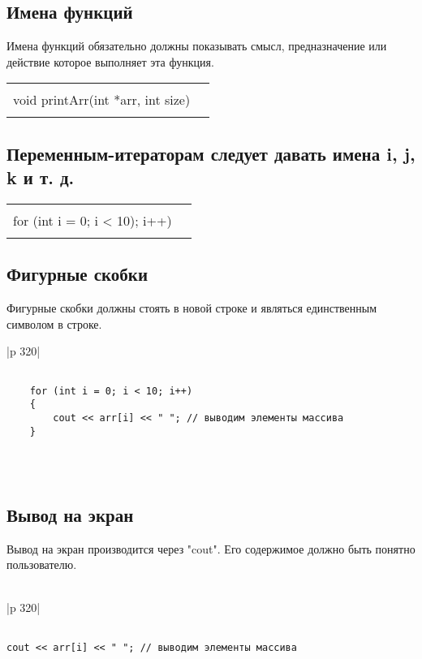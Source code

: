\documentclass{article}
\begin{document}
\subsection{Имена функций}
Имена функций обязательно должны показывать смысл, предназначение или действие которое выполняет эта функция.\\
\begin{tabular}{|c|c}
\hline
    \\
    void printArr(int *arr, int size)\\
    \\
\hline      
\end{tabular}

\subsection{Переменным-итераторам следует давать имена i, j, k и т. д.}

\begin{tabular}{|c|c}
\hline
    \\
    for (int i = 0; i < 10); i++)\\
    \\
\hline      
\end{tabular}

\subsection{Фигурные скобки}
Фигурные скобки должны стоять в новой строке и являться единственным символом в строке.\\
\begin{tabular}{|p {320}|}
\hline
\\
    \begin{verbatim}

    for (int i = 0; i < 10; i++) 
    {
        cout << arr[i] << " "; // выводим элементы массива
    }
            
    \end{verbatim}
\\
\hline      
\end{tabular}

\subsection{Вывод на экран}
Вывод на экран производится через "cout".
Его содержимое должно быть понятно пользователю.\\
\\
\begin{tabular}{|p {320}|}
\hline
\begin{verbatim}

cout << arr[i] << " "; // выводим элементы массива

\end{verbatim}
\\
\hline      
\end{tabular}
\\
\\
\\
\\
\end{document}
